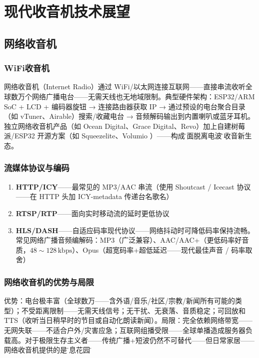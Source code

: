 \documentclass[12pt,UTF8]{ctexbook}
\begin{document}
\chapter{现代收音机技术展望}
\label{sec:modern_radio_future}

\section{网络收音机}
\label{sec:internet_radio}

\subsection{WiFi收音机}

网络收音机（Internet Radio）通过 WiFi/以太网连接互联网——直接串流收听全球数万个网络广播电台——无需天线也无地域限制。典型硬件架构：ESP32/ARM SoC + LCD + 编码器旋钮 → 连接路由器获取 IP → 通过预设的电台聚合目录（如 vTuner、Airable）搜索/收藏电台 → 音频解码输出到内置喇叭或蓝牙耳机。独立网络收音机产品（如 Ocean Digital、Grace Digital、Revo）加上自建树莓派/ESP32 开源方案（如 Squeezelite、Volumio ）——构成\"全面脱离电波\"的收音新生态。

\subsection{流媒体协议与编码}


\begin{enumerate}
\item \textbf{HTTP/ICY}——最常见的 MP3/AAC 串流（使用 Shoutcast / Icecast 协议——在 HTTP 头加 ICY-metadata 传递台名歌名）
\item \textbf{RTSP/RTP}——面向实时移动流的延时更低协议
\item \textbf{HLS/DASH}——自适应码率现代协议——网络抖动时可降低码率保持流畅。常见网络广播音频编解码：MP3（广泛兼容）、AAC/AAC+（更低码率好音质，$48\sim128\,\mathrm{kbps}$）、Opus（超宽码率+超低延迟——现代最佳声音 / 码率取舍）
\end{enumerate}

\subsection{网络收音机的优势与局限}

优势：电台极丰富（全球数万——含外语/音乐/社区/宗教/新闻所有可能的类型）；不受距离限制——无需天线信号；无干扰、无衰落、音质稳定；可回放和TTS（收听当日稍早时的节目或自动化朗读新闻）。局限：完全依赖网络带宽——无网失联——不适合户外/灾害应急；互联网组播受限——全球单播造成服务器负载高。对于极限生存主义者——传统广播+短波仍然不可替代——但日常家居——网络收音机提供的是\"信息花园\"。
\end{document}
